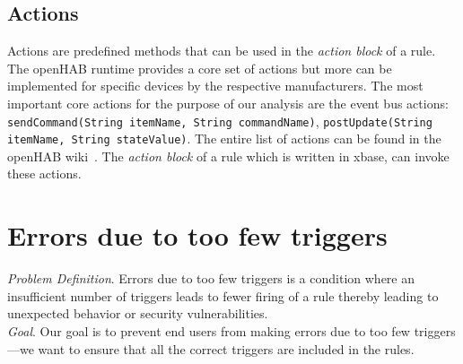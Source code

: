 \documentclass{sig-alternate-05-2015}
\begin{document}
\subsection{Actions}
\label{subsec:actions}
Actions are predefined methods that can be used in the \textit{action block} of a rule. The openHAB runtime provides a core set of actions but more can be implemented for specific devices by the respective manufacturers. The most important core actions for the purpose of our analysis are the event bus actions: \texttt{sendCommand(String itemName, String commandName)}, \texttt{postUpdate(String itemName, String stateValue)}. The entire list of actions can be found in the openHAB wiki~\cite{openhabwiki}. The \textit{action block} of a rule which is written in xbase, can invoke these actions. 

\section{Errors due to too few triggers}
\emph{Problem Definition}. Errors due to too few triggers is a condition where an insufficient number of triggers leads to fewer firing of a rule thereby leading to unexpected behavior or security vulnerabilities. \\

\emph{Goal}. Our goal is to prevent end users from making errors due to too few triggers---we want to ensure that all the correct triggers are included in the rules. \\
\end{document}
